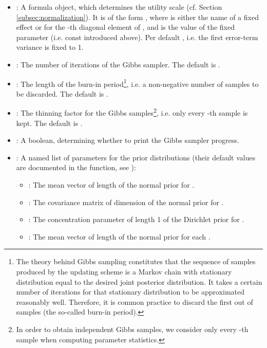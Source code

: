 \documentclass[article]{jss}
\newcommand{\fct}[1]{\code{#1()}}
\begin{document}
\begin{itemize}
  \item {}: A formula object, which determines the utility scale (cf. Section \ref{subsec:normalization}). It is of the form , where  is either the name of a fixed effect or  for the -th diagonal element of , and  is the value of the fixed parameter (i.e. $\text{const}$ introduced above). Per default , i.e. the first error-term variance is fixed to 1.
  \item {}: The number of iterations of the Gibbs sampler. The default is .
  \item {}: The length of the burn-in period\footnote{The theory behind Gibbs sampling constitutes that the sequence of samples produced by the
updating scheme is a Markov chain with stationary distribution equal to the desired joint posterior distribution. It takes a certain number of iterations for that stationary distribution to be approximated reasonably well. Therefore, it is common practice to discard the first  out of  samples (the so-called burn-in period).}, i.e. a non-negative number of samples to be discarded. The default is .
  \item {}: The thinning factor for the Gibbs samples\footnote{In order to obtain independent Gibbs samples, we consider only every -th sample when computing parameter statistics.}, i.e. only every -th sample is kept. The default is .
  \item {}: A boolean, determining whether to print the Gibbs sampler progress.
  \item {}: A named list of parameters for the prior distributions (their default values are documented in the \fct{check\_prior} function, see ):
  \begin{itemize}
    \item {}: The mean vector of length  of the normal prior for .
    \item {}: The covariance matrix of dimension  of the normal prior for .
    \item {}: The concentration parameter of length 1 of the Dirichlet prior for .
    \item {}: The mean vector of length  of the normal prior for each .

\end{itemize}
\end{itemize}
\end{document}
